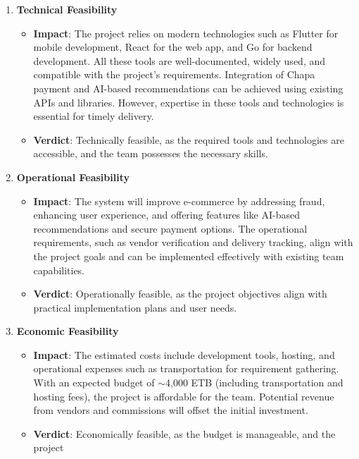 \documentclass[12pt]{report}
\begin{document}
\begin{enumerate}
	\item \textbf{Technical Feasibility}
	      \begin{itemize}
		      \item \textbf{Impact}: The project relies on modern technologies such as Flutter for mobile
		            development, React for the web app, and Go for backend development. All
		            these tools are well-documented, widely used, and compatible with the
		            project's requirements. Integration of Chapa payment and AI-based
		            recommendations can be achieved using existing APIs and libraries. However,
		            expertise in these tools and technologies is essential for timely delivery.
		      \item \textbf{Verdict}: Technically feasible, as the required tools and technologies are
		            accessible, and the team possesses the necessary skills.
	      \end{itemize}
	\item \textbf{Operational Feasibility}
	      \begin{itemize}
		      \item \textbf{Impact}: The system will improve e-commerce by addressing fraud, enhancing
		            user experience, and offering features like AI-based recommendations and
		            secure payment options. The operational requirements, such as vendor
		            verification and delivery tracking, align with the project goals and can be
		            implemented effectively with existing team capabilities.
		      \item \textbf{Verdict}: Operationally feasible, as the project objectives align with practical
		            implementation plans and user needs.
	      \end{itemize}
	\item \textbf{Economic Feasibility}
	      \begin{itemize}
		      \item \textbf{Impact}: The estimated costs include development tools, hosting, and
		            operational expenses such as transportation for requirement gathering. With an
		            expected budget of $\sim$4,000 ETB (including transportation and hosting fees),
		            the project is affordable for the team. Potential revenue from vendors and
		            commissions will offset the initial investment.
		      \item \textbf{Verdict}: Economically feasible, as the budget is manageable, and the project

\end{itemize}
\end{enumerate}
\end{document}
